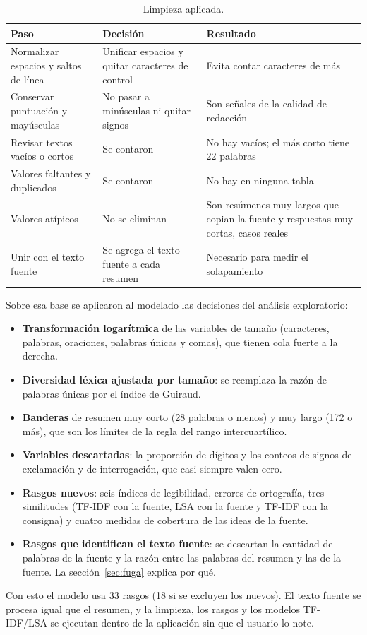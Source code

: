 \documentclass[11pt,a4paper]{article}
\begin{document}
\begin{table}[ht]
\centering\footnotesize
\caption{Limpieza aplicada.}
\label{tab:limpieza}
\begin{tabular}{P{3.8cm}P{4.4cm}P{5cm}}
\toprule
Paso & Decisión & Resultado \\
\midrule
Normalizar espacios y saltos de línea & Unificar espacios y quitar caracteres de control & Evita contar caracteres de más \\
Conservar puntuación y mayúsculas & No pasar a minúsculas ni quitar signos & Son señales de la calidad de redacción \\
Revisar textos vacíos o cortos & Se contaron & No hay vacíos; el más corto tiene 22 palabras \\
Valores faltantes y duplicados & Se contaron & No hay en ninguna tabla \\
Valores atípicos & No se eliminan & Son resúmenes muy largos que copian la fuente y respuestas muy cortas, casos reales \\
Unir con el texto fuente & Se agrega el texto fuente a cada resumen & Necesario para medir el solapamiento \\
\bottomrule
\end{tabular}
\end{table}

Sobre esa base se aplicaron al modelado las decisiones del análisis exploratorio:
\begin{itemize}[nosep]
\item \textbf{Transformación logarítmica} de las variables de tamaño (caracteres, palabras, oraciones, palabras únicas y comas), que tienen cola fuerte a la derecha.
\item \textbf{Diversidad léxica ajustada por tamaño}: se reemplaza la razón de palabras únicas por el índice de Guiraud.
\item \textbf{Banderas} de resumen muy corto (28 palabras o menos) y muy largo (172 o más), que son los límites de la regla del rango intercuartílico.
\item \textbf{Variables descartadas}: la proporción de dígitos y los conteos de signos de exclamación y de interrogación, que casi siempre valen cero.
\item \textbf{Rasgos nuevos}: seis índices de legibilidad, errores de ortografía, tres similitudes (TF-IDF con la fuente, LSA con la fuente y TF-IDF con la consigna) y cuatro medidas de cobertura de las ideas de la fuente.
\item \textbf{Rasgos que identifican el texto fuente}: se descartan la cantidad de palabras de la fuente y la razón entre las palabras del resumen y las de la fuente. La sección~\ref{sec:fuga} explica por qué.
\end{itemize}
Con esto el modelo usa 33 rasgos (18 si se excluyen los nuevos). El texto fuente se procesa igual que el resumen, y la limpieza, los rasgos y los modelos TF-IDF/LSA se ejecutan dentro de la aplicación sin que el usuario lo note.
\end{document}
